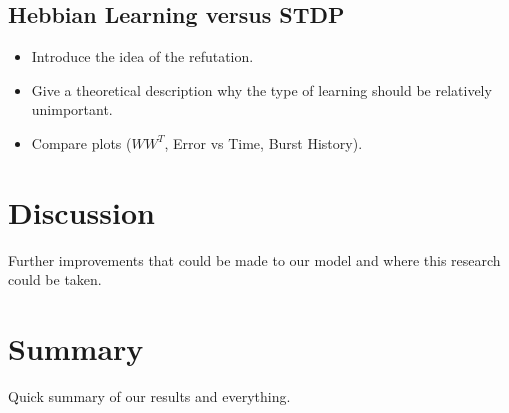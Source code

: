 \documentclass[12pt, draft]{article}
\begin{document}
\subsection{Hebbian Learning versus STDP}

\begin{itemize}
\item Introduce the idea of the refutation. 
\item Give a theoretical description why the type of learning should be relatively unimportant.
\item Compare plots (\(WW^T\), Error vs Time, Burst History).
\end{itemize}

\section{Discussion}

Further improvements that could be made to our model and where this research could be taken.

\section{Summary}

Quick summary of our results and everything.





\end{document}
